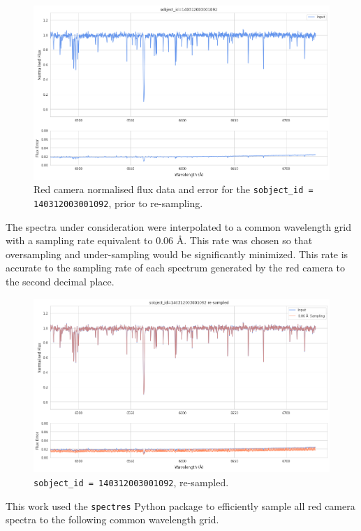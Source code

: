 \begin{figure}[!htb]
\centering
\includegraphics[scale=.40]{figures/input spectrum.png}
\caption{Red camera normalised flux data and error for the \texttt{sobject\_id = 140312003001092}, prior to re-sampling.}
\end{figure}

The spectra under consideration were interpolated to a common wavelength grid with a sampling rate equivalent to 0.06 \r{A}. This rate was chosen so that oversampling and under-sampling would be significantly minimized. This rate is accurate to the sampling rate of each spectrum generated by the red camera to the second decimal place. 

\begin{figure}[!htb]
\centering
\includegraphics[scale=.40]{figures/resampling example.png}
\caption{\texttt{sobject\_id = 140312003001092}, re-sampled.}
\end{figure}

This work used the \texttt{spectres} Python package\cite{carnall2017spectres} to efficiently sample all red camera spectra to the following common wavelength grid.

